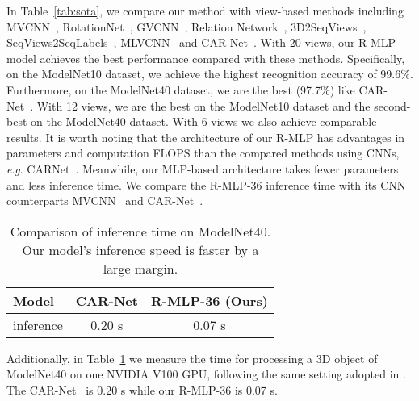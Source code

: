 \documentclass[11pt]{article}
\newcommand{\eg}{\textit{e}.\textit{g}. }
\begin{document}
In Table~\ref{tab:sota}, we compare our method with view-based methods including MVCNN~\citep{su2015multi}, RotationNet~\citep{kanezaki2018rotationnet}, GVCNN~\citep{feng2018gvcnn}, Relation Network~\citep{yang2019learning}, 3D2SeqViews~\citep{han20193d2seqvies}, SeqViews2SeqLabels~\citep{han2019seqview2seqlabels}, MLVCNN~\citep{jiang2019mlvcnn} and CAR-Net~\citep{xu2021multi}. With 20 views, our R-MLP model achieves the best performance compared with these methods. Specifically, on the ModelNet10 dataset, we achieve the highest recognition accuracy of 99.6\%. Furthermore, on the ModelNet40 dataset, we are the best (97.7\%) like CAR-Net~\citep{xu2021multi}.
With 12 views, we are the best on the ModelNet10 dataset and the second-best on the ModelNet40 dataset.
With 6 views we also achieve comparable results.
It is worth noting that the architecture of our R-MLP has advantages in parameters and computation FLOPS than the compared methods using CNNs, \eg CAR\-Net~\citep{xu2021multi}. Meanwhile, our MLP-based architecture takes fewer parameters and less inference time. We compare the R-MLP-36 inference time with its CNN counterparts MVCNN~\citep{su2015multi} and CAR-Net~\citep{xu2021multi}.

\begin{table}[ht]
\caption{Comparison of inference time on ModelNet40.
Our model's inference speed is faster by a large margin.}\label{tab:size}
\centering
\begin{tabular}{lcc}
\toprule
{Model} & CAR-Net \citep{xu2021multi} & R-MLP-36 (Ours) \\
\midrule
inference & 0.20 s & 0.07 s \\
\bottomrule
\end{tabular}\vspace{0.2in}
\end{table}

Additionally, in Table~\ref{tab:size} we measure the time for processing a 3D object of ModelNet40 on one NVIDIA V100 GPU, following the same setting adopted in \citep{xu2021multi}. The CAR-Net~\citep{xu2021multi} is 0.20 s while our R-MLP-36 is 0.07 s.
\end{document}
